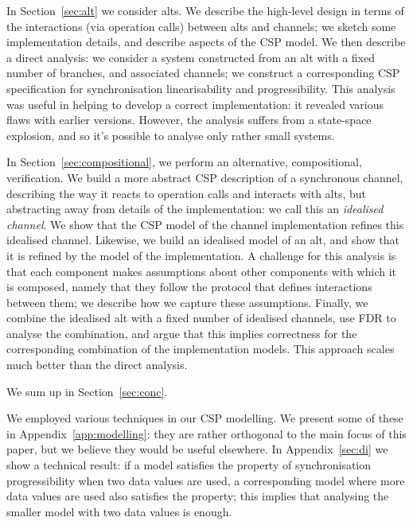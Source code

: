In Section~\ref{sec:alt} we consider alts.  We describe the high-level design
in terms of the interactions (via operation calls) between alts and channels;
we  sketch some implementation details, and describe aspects of the CSP
model.  We then describe a direct analysis: we consider a system constructed
from an alt with a fixed number of branches, and associated channels; we
construct a corresponding CSP specification for synchronisation
linearisability and progressibility.  This analysis was useful in helping to
develop a correct implementation: it revealed various flaws with earlier
versions.  However, the analysis suffers from a state-space explosion, and so
it's possible to analyse only rather small systems.

In Section~\ref{sec:compositional}, we perform an alternative, compositional,
verification.  We build a more abstract CSP description of a synchronous
channel, describing the way it reacts to operation calls and interacts with
alts, but abstracting away from details of the implementation: we call this an
\emph{idealised channel}.  We show that the CSP model of the channel
implementation refines this idealised channel.  Likewise, we build an
idealised model of an alt, and show that it is refined by the model of the
implementation.  A challenge for this analysis is that each component makes
assumptions about other components with which it is composed, namely that they
follow the protocol that defines interactions between them; we describe how we
capture these assumptions.  Finally, we combine the idealised alt with a fixed
number of idealised channels, use FDR to analyse the combination, and argue
that this implies correctness for the corresponding combination of the
implementation models.  This approach scales much better than the direct
analysis.

We sum up in Section~\ref{sec:conc}.

We employed various techniques in our CSP modelling.  We present some of these
in Appendix~\ref{app:modelling}: they are rather orthogonal to the main focus
of this paper, but we believe they would be useful elsewhere.  In
Appendix~\ref{sec:di} we show a technical result: if a model satisfies the
property of synchronisation progressibility when two data values are used, a
corresponding model where more data values are used also satisfies the
property; this implies that analysing the smaller model with two data values
is enough. 

